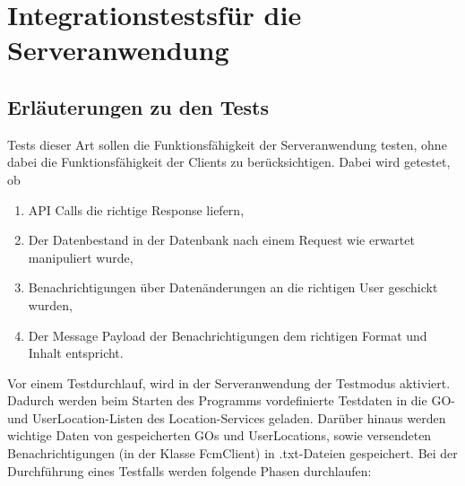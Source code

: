 \documentclass[11pt,a4paper]{scrartcl}
\begin{document}
\section{Integrationstestsfür die Serveranwendung}\label{ServerIT}
\subsection{Erläuterungen zu den Tests}
Tests dieser Art sollen die Funktionsfähigkeit der Serveranwendung testen, ohne dabei die Funktionsfähigkeit der Clients zu berücksichtigen. Dabei wird getestet, ob
\begin{enumerate}
	\item API Calls die richtige Response liefern,
	\item Der Datenbestand in der Datenbank nach einem Request wie erwartet manipuliert wurde,
	\item Benachrichtigungen über Datenänderungen an die richtigen User geschickt wurden,
	\item Der Message Payload der Benachrichtigungen dem richtigen Format und Inhalt entspricht.
\end{enumerate}

Vor einem Testdurchlauf, wird in der Serveranwendung der Testmodus aktiviert. Dadurch werden beim Starten des Programms vordefinierte Testdaten in die GO- und UserLocation-Listen des Location-Services geladen. Darüber hinaus werden wichtige Daten von gespeicherten GOs und UserLocations, sowie versendeten Benachrichtigungen (in der Klasse FcmClient) in .txt-Dateien gespeichert.
Bei der Durchführung eines Testfalls werden folgende Phasen durchlaufen:
\end{document}
